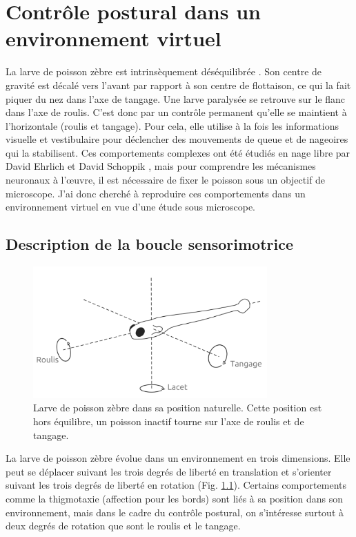 \chapter[Contrôle postural en VR]{Contrôle postural dans un environnement virtuel}\label{chapII}

La larve de poisson zèbre est intrinsèquement déséquilibrée \cite{bagnall_development_2018}. Son centre de gravité est décalé vers l'avant par rapport à son centre de flottaison, ce qui la fait piquer du nez dans l'axe de tangage. Une larve paralysée se retrouve sur le flanc dans l'axe de roulis. C'est donc par un contrôle permanent qu'elle se maintient à l'horizontale (roulis et tangage). Pour cela, elle utilise à la fois les informations visuelle et vestibulaire pour déclencher des mouvements de queue et de nageoires qui la stabilisent. Ces comportements complexes ont été étudiés en nage libre par David Ehrlich et David Schoppik \cite{ehrlich_control_2017}\cite{ehrlich_balance_2018}\cite{ehrlich_primal_2019}, mais pour comprendre les mécanismes neuronaux à l'œuvre, il est nécessaire de fixer le poisson sous un objectif de microscope. J'ai donc cherché à reproduire ces comportements dans un environnement virtuel en vue d'une étude sous microscope.

\section{Description de la boucle sensorimotrice}

\begin{figure}[b]
    \centering
    \includegraphics[width=0.8\textwidth]{./files/fish.png}
    \caption{Larve de poisson zèbre dans sa position naturelle. Cette position est hors équilibre, un poisson inactif tourne sur l'axe de roulis et de tangage.
    \label{FIGroulistangage}}
    \end{figure}

La larve de poisson zèbre évolue dans un environnement en trois dimensions. Elle peut se déplacer suivant les trois degrés de liberté en translation et s'orienter suivant les trois degrés de liberté en rotation (Fig. \ref{FIGroulistangage}). Certains comportements comme la thigmotaxie (affection pour les bords) sont liés à sa position dans son environnement, mais dans le cadre du contrôle postural, on s'intéresse surtout à deux degrés de rotation que sont le roulis et le tangage.

